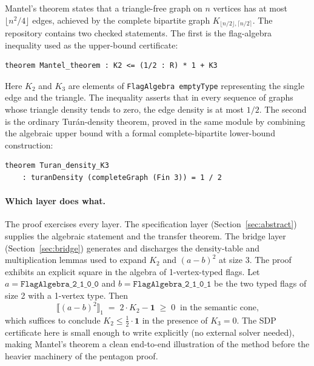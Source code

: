 \documentclass{article}
\newcommand{\lean}[1]{\texttt{#1}}
\begin{document}
Mantel's theorem states that a triangle-free graph on $n$ vertices has at
most $\lfloor n^2/4 \rfloor$ edges, achieved by the complete bipartite graph
$K_{\lfloor n/2\rfloor, \lceil n/2\rceil}$.  The repository contains two
checked statements.  The first is the flag-algebra inequality used as the
upper-bound certificate:
\begin{lstlisting}
theorem Mantel_theorem : K2 <= (1/2 : R) * 1 + K3
\end{lstlisting}
Here $K_2$ and $K_3$ are elements of \lean{FlagAlgebra emptyType} representing
the single edge and the triangle.  The inequality asserts that in every
sequence of graphs whose triangle density tends to zero, the edge density is
at most $1/2$.  The second is the ordinary Tur\'an-density theorem, proved
in the same module by combining the algebraic upper bound with a formal
complete-bipartite lower-bound construction:
\begin{lstlisting}
theorem Turan_density_K3
    : turanDensity (completeGraph (Fin 3)) = 1 / 2
\end{lstlisting}

\paragraph{Which layer does what.}
The proof exercises every layer.  The specification layer
(Section~\ref{sec:abstract}) supplies the algebraic statement and the
transfer theorem.  The bridge layer (Section~\ref{sec:bridge}) generates and
discharges the density-table and multiplication lemmas used to expand $K_2$
and $(a-b)^2$ at size $3$.  The proof exhibits an explicit square in the
algebra of 1-vertex-typed flags.  Let $a = \lean{FlagAlgebra\_2\_1\_0\_0}$
and $b = \lean{FlagAlgebra\_2\_1\_0\_1}$ be the two typed flags of size 2
with a 1-vertex type.  Then
\[
  \bigl\llbracket (a - b)^2 \bigr\rrbracket_1
  \;=\;
  2 \cdot K_2 - \mathbf{1}
  \;\geq\; 0
  \;\;\text{in the semantic cone,}
\]
which suffices to conclude $K_2 \leq \frac{1}{2} \cdot \mathbf{1}$ in the
presence of $K_3 = 0$.  The SDP certificate here is small enough to write
explicitly (no external solver needed), making Mantel's theorem a clean
end-to-end illustration of the method before the heavier machinery of the
pentagon proof.
\end{document}
